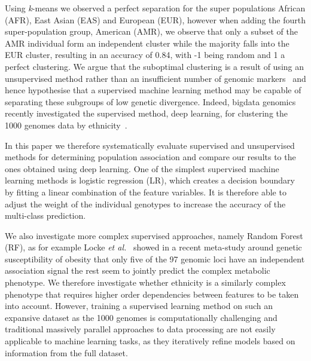 \documentclass{llncs}
\newcommand{\kMeans}{\textit{k}-means}
\begin{document}
{Using \kMeans{} we observed a perfect separation for the super populations African (AFR), East Asian (EAS) and European (EUR), however when adding the fourth super-population group, American (AMR), we observe that only a subset of the AMR individual form an independent cluster while the majority falls into the EUR cluster, resulting in an accuracy of 0.84, with -1 being random and 1 a perfect clustering.
We argue that the suboptimal clustering is a result of using an unsupervised method rather than an insufficient number of genomic markers~\cite{Patterson2006} and hence hypothesise that a supervised machine learning method may be capable of separating these subgroups of low genetic divergence.  
Indeed, bigdata genomics recently investigated the supervised method, deep learning, for clustering the 1000 genomes data by ethnicity~\cite{Ferguson}. 

In this paper we therefore systematically evaluate supervised and unsupervised methods for determining population association and compare our results to the ones obtained using deep learning. 
One of the simplest supervised machine learning methods is logistic regression (LR), which creates a decision boundary by fitting a linear combination of the feature variables. 
It is therefore able to adjust the weight of the individual genotypes to increase the accuracy of the multi-class prediction.    


 
We also investigate more complex supervised approaches, namely Random Forest (RF), as for example Locke {\it et al.}~\cite{Locke2015} showed in a recent meta-study around genetic susceptibility of obesity that only five of the 97 genomic loci have an independent association signal the rest seem to jointly predict the complex metabolic phenotype. 
We therefore investigate whether ethnicity is a similarly complex phenotype that requires higher order dependencies between features to be taken into account. %
However, training a supervised learning method on such an expansive dataset as the 1000 genomes is computationally challenging and traditional massively parallel approaches to data processing are not easily applicable to machine learning tasks, as they iteratively refine models based on information from the full dataset. 

}
\end{document}
